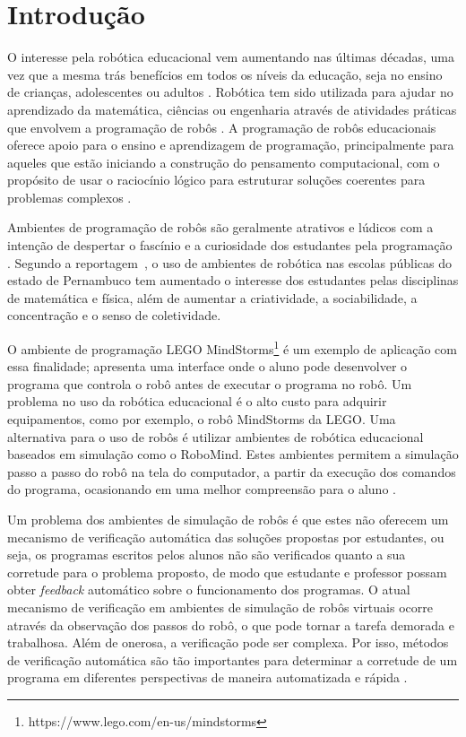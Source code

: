 \chapter{Introdução}

O interesse pela robótica educacional vem aumentando nas últimas décadas, uma vez que a mesma trás benefícios em todos os níveis da educação, seja no ensino de crianças, adolescentes ou adultos \cite{alimisis}. Robótica tem sido utilizada para ajudar no aprendizado da matemática, ciências ou engenharia através de atividades práticas que envolvem a programação de robôs \cite{Benitti2012}. A programação de robôs educacionais oferece apoio para o ensino e aprendizagem de programação, principalmente para aqueles que estão iniciando a construção do pensamento computacional, com o propósito de usar o raciocínio lógico para estruturar soluções coerentes para problemas complexos \cite{Bombasar2015}.

Ambientes de programação de robôs são geralmente atrativos e lúdicos com a intenção de despertar o fascínio e a curiosidade dos estudantes pela programação \cite{ESILVA}. Segundo a reportagem~, o uso de ambientes de robótica nas escolas públicas do estado de Pernambuco tem aumentado o interesse dos estudantes pelas disciplinas de matemática e física, além de aumentar a criatividade, a sociabilidade, a concentração e o senso de coletividade.

O ambiente de programação LEGO MindStorms\footnote{https://www.lego.com/en-us/mindstorms} é um exemplo de aplicação com essa finalidade; apresenta uma interface onde o aluno pode desenvolver o programa que controla o robô antes de executar o programa no robô. Um problema no uso da robótica educacional é o alto custo para adquirir equipamentos, como por exemplo, o robô MindStorms da LEGO. Uma alternativa para o uso de robôs é utilizar ambientes de robótica educacional baseados em simulação como o RoboMind. Estes ambientes permitem a simulação passo a passo do robô na tela do computador, a partir da execução dos comandos do programa, ocasionando em uma melhor compreensão para o aluno \cite{Lessa2015}. 

Um problema dos ambientes de simulação de robôs é que estes não oferecem um mecanismo de verificação automática das soluções propostas por estudantes, ou seja, os programas escritos pelos alunos não são verificados quanto a sua corretude para o problema proposto, de modo que estudante e professor possam obter \textit{feedback} automático sobre o funcionamento dos programas. O atual mecanismo de verificação em ambientes de simulação de robôs virtuais ocorre através da observação dos passos do robô, o que pode tornar a tarefa demorada e trabalhosa. Além de onerosa, a verificação pode ser complexa. Por isso, métodos de verificação automática são tão importantes para determinar a corretude de um programa em diferentes perspectivas de maneira automatizada e rápida \cite{Duarte}. 

